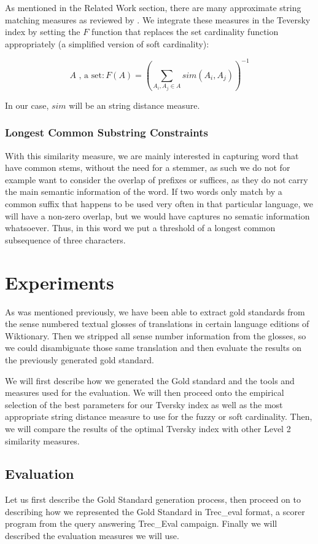 \documentclass[10pt,a4paper,twoside]{article}
\begin{document}
As mentioned in the Related Work section, there are many approximate string matching measures as reviewed by \cite{Cohen2003}. We integrate these measures in the Teversky index by setting the \(F\) function that replaces the set cardinality function appropriately (a simplified version of soft cardinality):

\[
	A \mbox{ , a set} : F(A) = (\sum_{A_i,A_j \in A}sim(A_i, A_j))^{-1}
\]

In our case, \(sim\) will be an string distance measure.

\subsubsection{Longest Common Substring Constraints}
With this similarity measure, we are mainly interested in capturing word that have common stems, without the need for a stemmer, as such we do not for example want to consider the overlap of prefixes or suffices, as they do not carry the main semantic information of the word. If two words only match by a common suffix that happens to be used very often in that particular language, we will have a non-zero overlap, but we would have captures no sematic information whatsoever. Thus, in this word we put a threshold of a longest common subsequence of three characters.

\section{Experiments}
\label{sec:expe}
As was mentioned previously, we have been able to extract gold standards from the sense numbered textual glosses of translations in certain language editions of Wiktionary. Then we stripped all sense number information from the glosses, so we could disambiguate those same translation and then evaluate the results on the previously generated gold standard.

We will first describe how we generated the Gold standard and the tools and measures used for the evaluation. We will then proceed onto the empirical selection of the best parameters for our Tversky index as well as the most appropriate string distance measure to use for the fuzzy or soft cardinality. Then, we will compare the results of the optimal Tversky index with other Level 2 similarity measures.
 
\subsection{Evaluation}
Let us first describe the Gold Standard generation process, then proceed on to describing how we represented the Gold Standard in Trec\_eval format, a scorer program from the query answering Trec\_Eval campaign. Finally we will described the evaluation measures we will use. 
\end{document}
